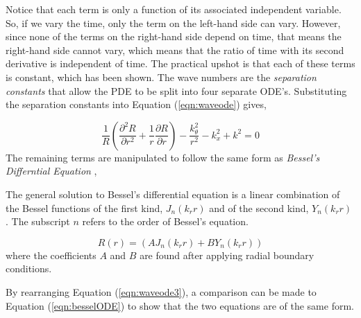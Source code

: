 Notice that each term is only a function of its associated independent variable.
So, if we vary the time, only the term on the left-hand side can vary. However,
since none of the terms on the right-hand side depend on time, that means the
right-hand side cannot vary, which means that the ratio of time with its second
derivative is independent of time. The practical upshot is that each of these 
terms is constant, which has been shown. The wave numbers are the \textit{separation constants} 
that allow the PDE to be split into four separate ODE's. Substituting the separation constants 
into Equation (\ref{eqn:waveode}) gives, 



\begin{equation}
    \frac{1}{R}
    \left(      
    \frac{\partial^2 R}{\partial r^2 } +
    \frac{1}{r}\frac{\partial R}{\partial r}  
\right) -
    \frac{k_{\theta}^2}{r^2}-  
    k_x^2 + k^2 = 0
    \label{eqn:waveode3}
\end{equation}
The remaining terms are manipulated to follow the same form as \textit{Bessel's Differntial 
Equation} ,


The general solution to Bessel's differential equation is a linear combination of
the Bessel functions of the first kind, $J_n(k_r r)$ and of the second kind, $Y_n(k_r r)$ 
\cite{wolphram:bessel}. The subscript $n$ refers to the order of Bessel's equation.

\begin{equation}
    R(r) = (AJ_n(k_r r) + BY_n(k_r r)) 
    \label{eqn:besselsolution}
\end{equation}
where the coefficients $A$ and $B$ are found after applying radial
boundary conditions. %

By rearranging Equation (\ref{eqn:waveode3}), a comparison can be made to Equation
(\ref{eqn:besselODE}) to show that the two equations are of the same form. 

